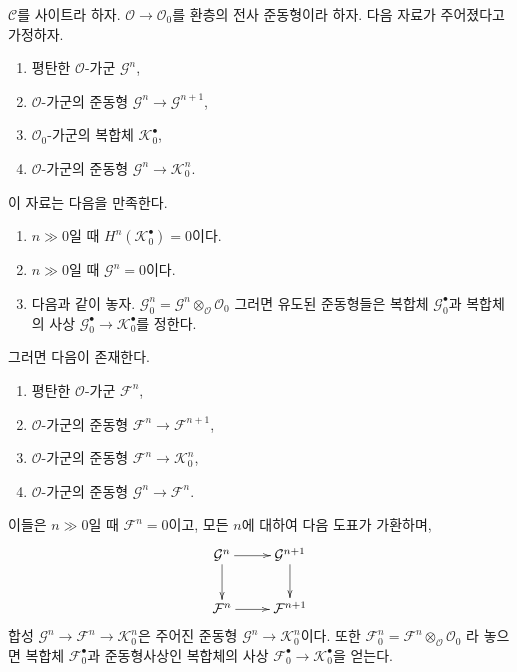 \begin{lemma}
\label{lemma-lift-complex}
$\mathcal{C}$를 사이트라 하자. $\mathcal{O} \to \mathcal{O}_0$를
환층의 전사 준동형이라 하자. 다음 자료가 주어졌다고 가정하자.
\begin{enumerate}
\item 평탄한 $\mathcal{O}$-가군 $\mathcal{G}^n$,
\item $\mathcal{O}$-가군의 준동형 $\mathcal{G}^n \to \mathcal{G}^{n + 1}$,
\item $\mathcal{O}_0$-가군의 복합체 $\mathcal{K}_0^\bullet$,
\item $\mathcal{O}$-가군의 준동형 $\mathcal{G}^n \to \mathcal{K}_0^n$.
\end{enumerate}
이 자료는 다음을 만족한다.
\begin{enumerate}
\item[(a)] $n \gg 0$일 때 $H^n(\mathcal{K}_0^\bullet) = 0$이다.
\item[(b)] $n \gg 0$일 때 $\mathcal{G}^n = 0$이다.
\item[(c)] 다음과 같이 놓자.
$\mathcal{G}^n_0 = \mathcal{G}^n \otimes_\mathcal{O} \mathcal{O}_0$
그러면 유도된 준동형들은 복합체 $\mathcal{G}_0^\bullet$과 복합체의
사상 $\mathcal{G}_0^\bullet \to \mathcal{K}_0^\bullet$를 정한다.
\end{enumerate}
그러면 다음이 존재한다.
\begin{enumerate}
\item[(\romannumeral1)]
평탄한 $\mathcal{O}$-가군 $\mathcal{F}^n$,
\item[(\romannumeral2)]
$\mathcal{O}$-가군의 준동형 $\mathcal{F}^n \to \mathcal{F}^{n + 1}$,
\item[(\romannumeral3)]
$\mathcal{O}$-가군의 준동형 $\mathcal{F}^n \to \mathcal{K}_0^n$,
\item[(\romannumeral4)]
$\mathcal{O}$-가군의 준동형 $\mathcal{G}^n \to \mathcal{F}^n$.
\end{enumerate}
이들은 $n \gg 0$일 때 $\mathcal{F}^n = 0$이고, 모든 $n$에 대하여
다음 도표가 가환하며,
$$
\xymatrix{
\mathcal{G}^n \ar[r] \ar[d] & \mathcal{G}^{n + 1} \ar[d] \\
\mathcal{F}^n \ar[r] & \mathcal{F}^{n + 1}
}
$$
합성 $\mathcal{G}^n \to \mathcal{F}^n \to \mathcal{K}_0^n$은 주어진
준동형 $\mathcal{G}^n \to \mathcal{K}_0^n$이다. 또한
$\mathcal{F}^n_0 = \mathcal{F}^n \otimes_\mathcal{O} \mathcal{O}_0$
라 놓으면 복합체 $\mathcal{F}_0^\bullet$과 준동형사상인 복합체의 사상
$\mathcal{F}_0^\bullet \to \mathcal{K}_0^\bullet$을 얻는다.
\end{lemma}

